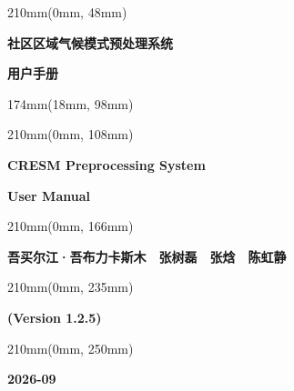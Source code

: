 \documentclass[a4paper,12pt]{ctexart}
\begin{document}
\begin{textblock*}{210mm}(0mm, 48mm)
    \centering
    {\fontsize{31pt}{44pt}\selectfont\bfseries\color{black} 社区区域气候模式预处理系统\par}
    {\fontsize{31pt}{44pt}\selectfont\bfseries\color{black} 用户手册\par}
\end{textblock*}

\begin{textblock*}{174mm}(18mm, 98mm)
    \noindent{\color{CPSNavy!20}\rule{174mm}{0.45pt}}
\end{textblock*}

\begin{textblock*}{210mm}(0mm, 108mm)
    \centering
    {\fontsize{25pt}{35pt}\selectfont\bfseries\color{black} CRESM Preprocessing System\par}
    {\fontsize{25pt}{35pt}\selectfont\bfseries\color{black} User Manual\par}
\end{textblock*}


\begin{textblock*}{210mm}(0mm, 166mm)
    \centering
    {\fontsize{18pt}{25pt}\selectfont\bfseries\color{black}
    吾买尔江·吾布力卡斯木　张树磊　张焓　陈虹静\par}
\end{textblock*}

\begin{textblock*}{210mm}(0mm, 235mm)
    \centering
    {\fontsize{16pt}{24pt}\selectfont\bfseries\color{black} (Version 1.2.5)\par}
\end{textblock*}

\begin{textblock*}{210mm}(0mm, 250mm)
    \centering
    {\fontsize{16pt}{24pt}\selectfont\bfseries\color{black} 2026-09\par}
\end{textblock*}
\end{document}
